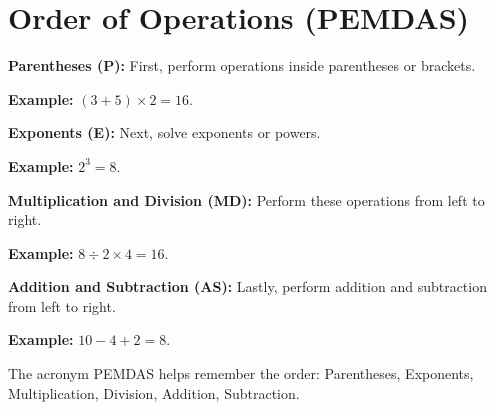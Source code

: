 \section{Order of Operations (PEMDAS)}

\textbf{Parentheses (P):} First, perform operations inside parentheses or brackets.

\textbf{Example:} \( (3 + 5) \times 2 = 16 \).

\textbf{Exponents (E):} Next, solve exponents or powers.

\textbf{Example:} \( 2^3 = 8 \).

\textbf{Multiplication and Division (MD):} Perform these operations from left to right.

\textbf{Example:} \( 8 \div 2 \times 4 = 16 \).

\textbf{Addition and Subtraction (AS):} Lastly, perform addition and subtraction from left to right.

\textbf{Example:} \( 10 - 4 + 2 = 8 \).

The acronym PEMDAS helps remember the order: Parentheses, Exponents, Multiplication, Division, Addition, Subtraction.
